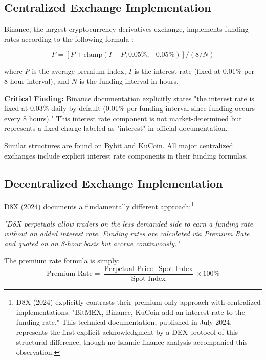 \documentclass[10pt,twocolumn]{article}
\begin{document}
\subsection{Centralized Exchange Implementation}

Binance, the largest cryptocurrency derivatives exchange, implements funding rates according to the following formula \citep{Binance2019}:

\begin{equation}
F = [P + \text{clamp}(I - P, 0.05\%, -0.05\%)] / (8/N)
\end{equation}

where $P$ is the average premium index, $I$ is the interest rate (fixed at 0.01\% per 8-hour interval), and $N$ is the funding interval in hours.

\textbf{Critical Finding:} Binance documentation explicitly states "the interest rate is fixed at 0.03\% daily by default (0.01\% per funding interval since funding occurs every 8 hours)." This interest rate component is not market-determined but represents a fixed charge labeled as "interest" in official documentation.

Similar structures are found on Bybit and KuCoin. All major centralized exchanges include explicit interest rate components in their funding formulas.

\subsection{Decentralized Exchange Implementation}

D8X (2024) documents a fundamentally different approach:\footnote{D8X (2024) explicitly contrasts their premium-only approach with centralized implementations: "BitMEX, Binance, KuCoin add an interest rate to the funding rate." This technical documentation, published in July 2024, represents the first explicit acknowledgment by a DEX protocol of this structural difference, though no Islamic finance analysis accompanied this observation.}

\textit{"D8X perpetuals allow traders on the less demanded side to earn a funding rate without an added interest rate. Funding rates are calculated via Premium Rate and quoted on an 8-hour basis but accrue continuously."}

The premium rate formula is simply:
\begin{equation}
\text{Premium Rate} = \frac{\text{Perpetual Price} - \text{Spot Index}}{\text{Spot Index}} \times 100\%
\end{equation}
\end{document}
